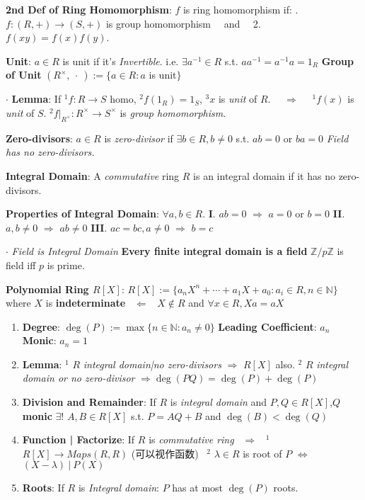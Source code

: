 \documentclass[9pt]{article}
\begin{document}
\textbf{2nd Def of Ring Homomorphism}: {\small $f$ is ring homomorphism if: . $f:(R,+)\to (S,+)$ is group homomorphism \ \ and \ \ 2. $f(xy)=f(x)f(y)$.}

\textbf{Unit}: $a\in R$ is unit if it's \textit{Invertible}. \quad i.e. $\exists a^{-1}\in R$ s.t. $aa^{-1}=a^{-1} a=1_R$ \qquad \textbf{Group of Unit} $(R^{\times},\ \cdot \ ):=\{a\in R:a$ is unit$\}$

$\cdot$ \textbf{Lemma}: If $^1f:R\to S$ homo, $^2f(1_R)=1_S$, $^3x$ is \textit{unit} of $R$. \ \ $\Rightarrow$ \ \ $^1f(x)$ is \textit{unit} of $S$. \quad $^2f|_{R^\times}:R^\times\to S^\times$ is \textit{group homomorphism}.

\textbf{Zero-divisors}: $a\in R$ is \textit{zero-divisor} if $\exists b\in R,b\ne0$ s.t. $ab=0$ or $ba=0$ \qquad \textit{Field has no zero-divisors.}  

\textbf{Integral Domain}: A \textit{commutative} ring $R$ is an integral domain if it has no zero-divisors. \qquad {}

\textbf{Properties of Integral Domain}: $\forall a,b\in R$. \quad \textbf{I}. $ab=0$ $\Rightarrow$ $a=0$ or $b=0$ \quad \textbf{II}. $a,b\ne0$ $\Rightarrow$ $ab\ne0$ \qquad \textbf{III}. $ac=bc,a\ne0$ $\Rightarrow$ $b=c$

$\cdot$ \textit{Field is Integral Domain} \qquad \textbf{Every finite integral domain is a field} \qquad $\mathbb{Z}/p\mathbb{Z}$ is field iff $p$ is prime. 

\textbf{Polynomial Ring $R[X]$}: $R[X]:=\{a_nX^n+\cdots+a_1X+a_0:a_i\in R,n\in\mathbb{N}\}$ where $X$ is \textbf{indeterminate} \ $\Leftarrow$ \ $X\notin R$ and $\forall x\in R,Xa=aX$

\begin{enumerate}[itemsep=-2pt, topsep=-2pt]
    \item \textbf{Degree}: $\deg(P):=\max\{n\in\mathbb{N}:a_n\ne0\}$ \quad \textbf{Leading Coefficient}: $a_n$ \quad \textbf{Monic}: $a_n=1$ \quad \quad {}
    \item \textbf{Lemma}: {\small $^1$ $R$ \textit{integral domain|no zero-divisors} $\Rightarrow$ $R[X]$ also. \qquad $^2$ $R$ \textit{integral domain or no zero-divisor} $\Rightarrow\deg(PQ)=\deg(P)+\deg(P)$}
    \item \textbf{Division and Remainder}: If $R$ is \textit{integral domain} and $P,Q\in R[X]$,{\scriptsize $Q$ \textbf{monic}} $\exists!$ $A,B\in R[X]$ s.t. $P=AQ+B$ and $\deg(B)<\deg(Q)$
    \item \textbf{Function | Factorize}: If $R$ is \textit{commutative ring} \ $\Rightarrow$ \ $^1$ $R[X]\to Maps(R,R)$ {\scriptsize (可以视作函数)} \ $^2$ $\lambda\in R$ is root of $P$ $\Leftrightarrow$ $(X-\lambda) \ | \ P(X)$
    \item \textbf{Roots}: If $R$ is \textit{Integral domain}: $P$ has at most $\deg(P)$ roots.
\end{enumerate}
\end{document}
